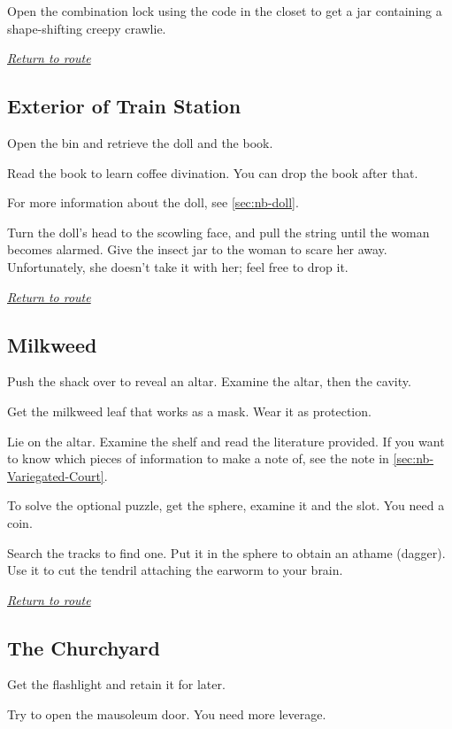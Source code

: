 \documentclass[a5paper]{extarticle}
\begin{document}
Open the combination lock using the code in the closet
to get a jar containing a shape-shifting creepy crawlie.

\hyperref[sec:route]{\emph{Return to route}}

\newpage
\subsection{Exterior of Train Station}\label{sec:sol-Exterior-of-Train-Station}

Open the bin and retrieve the doll and the book.

Read the book to learn coffee divination. You can drop the book after that.

For more information about the doll, see \cref{sec:nb-doll}.

Turn the doll's head to the scowling face, and pull the string until the woman becomes alarmed.
Give the insect jar to the woman to scare her away.
Unfortunately, she doesn't take it with her; feel free to drop it.

\hyperref[sec:route]{\emph{Return to route}}

\newpage
\subsection{Milkweed}\label{sec:sol-Milkweed}
Push the shack over to reveal an altar. Examine the altar, then the cavity.

Get the milkweed leaf that works as a mask. Wear it as protection.

Lie on the altar. Examine the shelf and read the literature provided.
If you want to know which pieces of information to make a note of,
see the note in \cref{sec:nb-Variegated-Court}.

To solve the optional puzzle, get the sphere, examine it and the slot.
You need a coin.

Search the tracks to find one. Put it in the sphere to obtain an athame (dagger).
Use it to cut the tendril attaching the earworm to your brain.

\hyperref[sec:route]{\emph{Return to route}}

\newpage
\subsection{The Churchyard}\label{sec:sol-Churchyard}

Get the flashlight and retain it for later.

Try to open the mausoleum door. You need more leverage.
\end{document}

